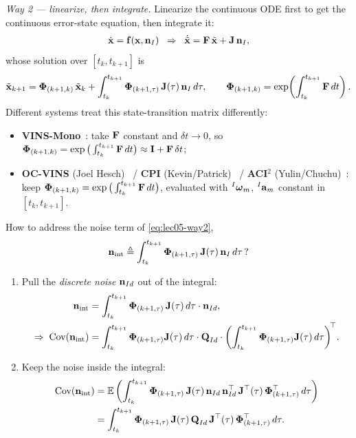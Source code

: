 \emph{Way 2 --- linearize, then integrate.} Linearize the continuous ODE first to get the continuous error-state equation, then integrate it:
\begin{align}
\dot{\boldsymbol{\mathbf{x}}} = \boldsymbol{\mathbf{f}}(\boldsymbol{\mathbf{x}},\boldsymbol{\mathbf{n}}_I)
\;\;\Rightarrow\;\;
\dot{\tilde{\boldsymbol{\mathbf{x}}}} = \boldsymbol{\mathbf{F}}\,\tilde{\boldsymbol{\mathbf{x}}} + \boldsymbol{\mathbf{J}}\,\boldsymbol{\mathbf{n}}_I,
\end{align}
whose solution over $[t_k,t_{k+1}]$ is
\begin{align}
\tilde{\boldsymbol{\mathbf{x}}}_{k+1} = \boldsymbol{\mathbf{\Phi}}_{(k+1,k)}\,\tilde{\boldsymbol{\mathbf{x}}}_k + \int_{t_k}^{t_{k+1}} \boldsymbol{\mathbf{\Phi}}_{(k+1,\tau)}\,\boldsymbol{\mathbf{J}}(\tau)\,\boldsymbol{\mathbf{n}}_I\,d\tau,
\qquad
\boldsymbol{\mathbf{\Phi}}_{(k+1,k)} = \exp\!\left(\int_{t_k}^{t_{k+1}} \boldsymbol{\mathbf{F}}\,dt\right).
\label{eq:lec05-way2}
\end{align}
Different systems treat this state-transition matrix differently:
\begin{itemize}[noitemsep,topsep=2pt]
\item \textbf{VINS-Mono}~\cite{Qin2017TRO}: take $\boldsymbol{\mathbf{F}}$ constant and $\delta t \to 0$, so
$\boldsymbol{\mathbf{\Phi}}_{(k+1,k)} = \exp\big(\int_{t_k}^{t_{k+1}}\boldsymbol{\mathbf{F}}\,dt\big) \approx \boldsymbol{\mathbf{I}} + \boldsymbol{\mathbf{F}}\,\delta t$;
\item \textbf{OC-VINS} (Joel Hesch)~\cite{Hesch2013TRO} / \textbf{CPI} (Kevin/Patrick)~\cite{Eckenhoff2019IJRR} / \textbf{ACI$^2$} (Yulin/Chuchu)~\cite{Yang2020ACI2}: keep
$\boldsymbol{\mathbf{\Phi}}_{(k+1,k)} = \exp\big(\int_{t_k}^{t_{k+1}}\boldsymbol{\mathbf{F}}\,dt\big)$, evaluated with ${}^{I}\boldsymbol{\mathbf{\omega}}_m$, ${}^{I}\boldsymbol{\mathbf{a}}_m$ constant in $[t_k,t_{k+1}]$.
\end{itemize}
How to address the noise term of \eqref{eq:lec05-way2},
\begin{align}
\boldsymbol{\mathbf{n}}_{\mathrm{int}} \triangleq \int_{t_k}^{t_{k+1}} \boldsymbol{\mathbf{\Phi}}_{(k+1,\tau)}\,\boldsymbol{\mathbf{J}}(\tau)\,\boldsymbol{\mathbf{n}}_I\,d\tau\,?
\end{align}
\begin{enumerate}[label=(\arabic*),noitemsep,topsep=2pt]
\item Pull the \emph{discrete noise} $\boldsymbol{\mathbf{n}}_{Id}$ out of the integral:
\begin{align}
\boldsymbol{\mathbf{n}}_{\mathrm{int}} &= \int_{t_k}^{t_{k+1}} \boldsymbol{\mathbf{\Phi}}_{(k+1,\tau)}\,\boldsymbol{\mathbf{J}}(\tau)\,d\tau\cdot\boldsymbol{\mathbf{n}}_{Id}, \\
\Rightarrow\;
\text{Cov}(\boldsymbol{\mathbf{n}}_{\mathrm{int}}) &= \int_{t_k}^{t_{k+1}} \boldsymbol{\mathbf{\Phi}}_{(k+1,\tau)}\boldsymbol{\mathbf{J}}(\tau)\,d\tau
\cdot \boldsymbol{\mathbf{Q}}_{Id} \cdot
\left(\int_{t_k}^{t_{k+1}} \boldsymbol{\mathbf{\Phi}}_{(k+1,\tau)}\boldsymbol{\mathbf{J}}(\tau)\,d\tau\right)^{\!\top}\!.
\end{align}
\item Keep the noise inside the integral:
\begin{align}
\text{Cov}(\boldsymbol{\mathbf{n}}_{\mathrm{int}})
&= \mathbb{E}\left(\int_{t_k}^{t_{k+1}} \boldsymbol{\mathbf{\Phi}}_{(k+1,\tau)}\,\boldsymbol{\mathbf{J}}(\tau)\,\boldsymbol{\mathbf{n}}_{Id}\,\boldsymbol{\mathbf{n}}_{Id}^\top\,\boldsymbol{\mathbf{J}}^\top(\tau)\,\boldsymbol{\mathbf{\Phi}}_{(k+1,\tau)}^\top\,d\tau\right) \\
&= \int_{t_k}^{t_{k+1}} \boldsymbol{\mathbf{\Phi}}_{(k+1,\tau)}\,\boldsymbol{\mathbf{J}}(\tau)\,\boldsymbol{\mathbf{Q}}_{Id}\,\boldsymbol{\mathbf{J}}^\top(\tau)\,\boldsymbol{\mathbf{\Phi}}_{(k+1,\tau)}^\top\,d\tau.
\end{align}
\end{enumerate}

